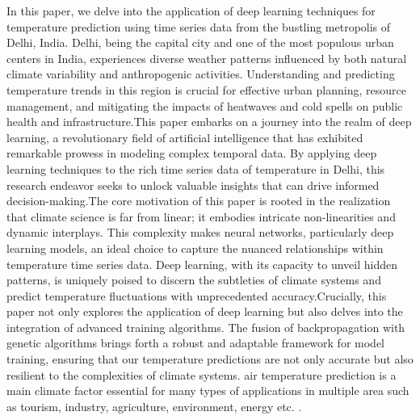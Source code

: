 \documentclass[sn-mathphys,Numbered]{sn-jnl}
\theoremstyle{thmstyleone}
\theoremstyle{thmstyletwo}
\theoremstyle{thmstylethree}
\begin{document}
In this paper, we delve into the application of deep learning techniques for temperature prediction using time series data from the bustling metropolis of Delhi, India. Delhi, being the capital city and one of the most populous urban centers in India, experiences diverse weather patterns influenced by both natural climate variability and anthropogenic activities. Understanding and predicting temperature trends in this region is crucial for effective urban planning, resource management, and mitigating the impacts of heatwaves and cold spells on public health and infrastructure.This paper embarks on a journey into the realm of deep learning, a revolutionary field of artificial intelligence that has exhibited remarkable prowess in modeling complex temporal data. By applying deep learning techniques to the rich time series data of temperature in Delhi, this research endeavor seeks to unlock valuable insights that can drive informed decision-making.The core motivation of this paper is rooted in the realization that climate science is far from linear; it embodies intricate non-linearities and dynamic interplays. This complexity makes neural networks, particularly deep learning models, an ideal choice to capture the nuanced relationships within temperature time series data. Deep learning, with its capacity to unveil hidden patterns, is uniquely poised to discern the subtleties of climate systems and predict temperature fluctuations with unprecedented accuracy.Crucially, this paper not only explores the application of deep learning but also delves into the integration of advanced training algorithms. The fusion of backpropagation with genetic algorithms brings forth a robust and adaptable framework for model training, ensuring that our temperature predictions are not only accurate but also resilient to the complexities of climate systems. air temperature prediction is a main climate factor essential for many types of applications in multiple area such as tourism,  industry, agriculture,  environment,  energy etc. \cite{abdel2004hourly}.
\end{document}
